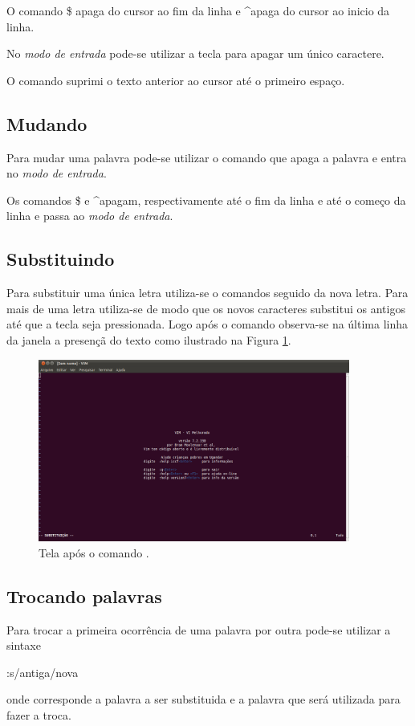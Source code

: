 O comando \$ apaga do cursor ao fim da linha e \textasciicircum apaga do cursor ao inicio da linha.

No \textit{modo de entrada} pode-se utilizar a tecla  para apagar um único caractere.

O comando  suprimi o texto anterior ao cursor até o primeiro espaço.

\subsection{Mudando}
Para mudar uma palavra pode-se utilizar o comando  que apaga a palavra e entra no \textit{modo de entrada}.

Os comandos \$ e \textasciicircum apagam, respectivamente até o fim da linha e até o começo da linha e passa ao \textit{modo de entrada}.

\subsection{Substituindo}
Para substituir uma única letra utiliza-se o comandos  seguido da nova letra. Para mais de uma letra utiliza-se  de modo que os novos caracteres substitui os antigos até que a tecla  seja pressionada. Logo após o comando  observa-se na última linha da janela a presençã do texto  como ilustrado na Figura \ref{fig:vim_replace_screen}.
\begin{figure}[h!]
    \centering
    \includegraphics[height=6cm]{figures/vim_replace_screen}
    \caption{Tela após o comando .}
    \label{fig:vim_replace_screen}
\end{figure}

\subsection{Trocando palavras}
Para trocar a primeira ocorrência de uma palavra por outra pode-se utilizar a sintaxe
\begin{code}
    :s/antiga/nova
\end{code}
onde  corresponde a palavra a ser substituida e  a palavra que será utilizada para fazer a troca.

